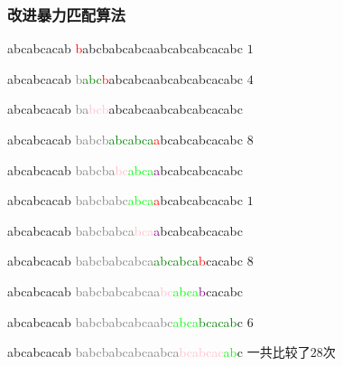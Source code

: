 \documentclass{ctexbeamer}
\newcommand{\red}[1]{\textcolor{red}{#1}}
\newcommand{\pink}[1]{\textcolor{pink}{#1}}
\newcommand{\green}[1]{\textcolor{green}{#1}}
\newcommand{\gray}[1]{\textcolor{gray}{#1}}
\newcommand{\lime}[1]{\textcolor{lime}{#1}}
\newcommand{\purple}[1]{\textcolor{purple}{#1}}
\begin{document}
\begin{frame}[fragile]
\frametitle{改进暴力匹配算法}

\begin{tverb}[frame=bottomline, fontsize=\small]
abcabcacab
\red{b}abcbabcabcaabcabcabcacabc \(1\)
\end{tverb}

	\begin{tverb}[frame=bottomline, fontsize=\small]
 abcabcacab
\gray{b}\green{abc}\red{b}abcabcaabcabcabcacabc \(4\)
	\end{tverb}

\begin{tverb}[frame=bottomline, fontsize=\small]
     abcabcacab
\gray{ba}\pink{bcb}abcabcaabcabcabcacabc
\end{tverb}

\begin{tverb}[frame=bottomline, fontsize=\small]
     abcabcacab
\gray{babcb}\green{abcabca}\red{a}bcabcabcacabc \(8\)
\end{tverb}

\begin{tverb}[frame=bottomline, fontsize=\small]
        abcabcacab
\gray{babcba}\pink{bc}\lime{abca}\purple{a}bcabcabcacabc
\end{tverb}

\begin{tverb}[frame=bottomline, fontsize=\small]
        abcabcacab
\gray{babcbabc}\lime{abca}\red{a}bcabcabcacabc \(1\)
\end{tverb}

\begin{tverb}[frame=bottomline, fontsize=\small]
            abcabcacab
\gray{babcbabca}\pink{bca}\purple{a}bcabcabcacabc
\end{tverb}

\begin{tverb}[frame=bottomline, fontsize=\small]
            abcabcacab
\gray{babcbabcabca}\green{abcabca}\red{b}cacabc \(8\)
\end{tverb}

\begin{tverb}[frame=bottomline, fontsize=\small]
               abcabcacab
\gray{babcbabcabcaa}\pink{bc}\lime{abca}\purple{b}cacabc
\end{tverb}

\begin{tverb}[frame=bottomline, fontsize=\small]
               abcabcacab
\gray{babcbabcabcaabc}\lime{abca}\green{bcacab}c \(6\)
\end{tverb}

\begin{tverb}[frame=bottomline, fontsize=\small]
                       abcabcacab
\gray{babcbabcabcaabca}\pink{bcabcac}\lime{ab}c           一共比较了\(28\)次
\end{tverb}

\end{frame}
\end{document}
